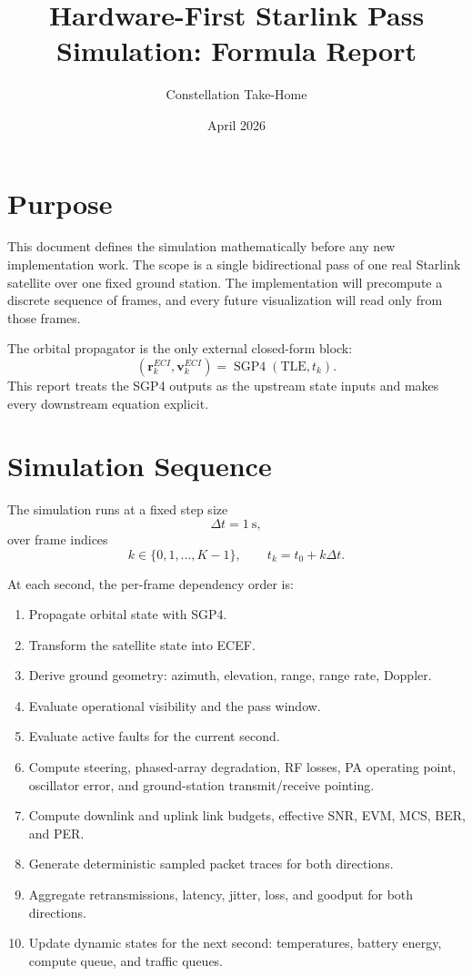 \documentclass[11pt]{article}
\title{Hardware-First Starlink Pass Simulation: Formula Report}
\author{Constellation Take-Home}
\date{April 2026}
\newcommand{\vect}[1]{\mathbf{#1}}
\begin{document}
\maketitle

\section{Purpose}

This document defines the simulation mathematically before any new implementation work.
The scope is a single bidirectional pass of one real Starlink satellite over one fixed
ground station. The implementation will precompute a discrete sequence of frames, and
every future visualization will read only from those frames.

The orbital propagator is the only external closed-form block:
\begin{equation}
  \left( \vect{r}^{ECI}_k, \vect{v}^{ECI}_k \right)
  =
  \operatorname{SGP4}(\mathrm{TLE}, t_k).
\end{equation}
This report treats the SGP4 outputs as the upstream state inputs and makes every
downstream equation explicit.

\section{Simulation Sequence}

The simulation runs at a fixed step size
\begin{equation}
  \Delta t = 1 \ \mathrm{s},
\end{equation}
over frame indices
\begin{equation}
  k \in \{0,1,\dots,K-1\},
  \qquad
  t_k = t_0 + k \Delta t.
\end{equation}

At each second, the per-frame dependency order is:
\begin{enumerate}
  \item Propagate orbital state with SGP4.
  \item Transform the satellite state into ECEF.
  \item Derive ground geometry: azimuth, elevation, range, range rate, Doppler.
  \item Evaluate operational visibility and the pass window.
  \item Evaluate active faults for the current second.
  \item Compute steering, phased-array degradation, RF losses, PA operating point,
        oscillator error, and ground-station transmit/receive pointing.
  \item Compute downlink and uplink link budgets, effective SNR, EVM, MCS, BER, and PER.
  \item Generate deterministic sampled packet traces for both directions.
  \item Aggregate retransmissions, latency, jitter, loss, and goodput for both directions.
  \item Update dynamic states for the next second: temperatures, battery energy,
        compute queue, and traffic queues.
\end{enumerate}
\end{document}
